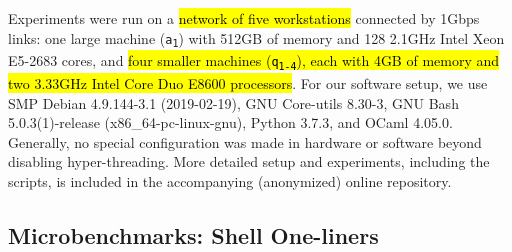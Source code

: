 \documentclass[sigplan,10pt,review,anonymous]{acmart}
\newcommand{\ttt}[1]{\texttt{\small #1}}
\newcommand{\wka}{\ttt{a\textsubscript{1}}}
\newcommand{\wkq}{\ttt{q\textsubscript{1-4}}}
\newcommand{\todo}[1]{\hl{#1}\xspace}
\begin{document}
Experiments were run on a \todo{network of five workstations} connected by 1Gbps links: 
 one large machine (\wka) with 512GB of memory and 128 2.1GHz Intel Xeon E5-2683 cores, and 
 \todo{four smaller machines (\wkq), each with 4GB of memory and two 3.33GHz Intel Core Duo E8600 processors}.
For our software setup, we use SMP Debian 4.9.144-3.1 (2019-02-19), GNU Core-utils 8.30-3, GNU Bash 5.0.3(1)-release (x86\_64-pc-linux-gnu), Python 3.7.3, and OCaml 4.05.0.
Generally, no special configuration was made in hardware or software beyond disabling hyper-threading. %
More detailed setup and experiments, including the scripts, is included in the accompanying (anonymized) online repository.

\subsection{Microbenchmarks: Shell One-liners}
\end{document}

